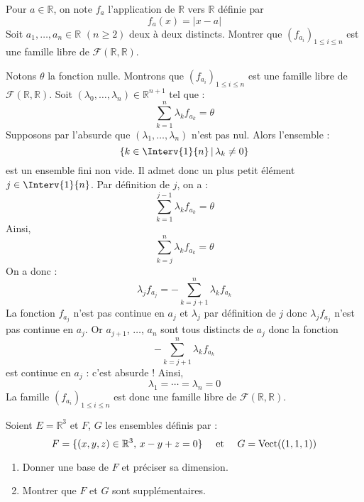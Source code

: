 \documentclass[a4paper,10pt]{report}
\begin{document}
\begin{Exercice}{} Pour $a \in \mathbb{R}$, on note $f_a$ l'application de $\mathbb{R}$ vers $\mathbb{R}$ définie par 
$$f_a(x) = \vert x - a \vert$$
Soit $a_1, \ldots, a_n \in \mathbb{R}$ $(n \geq 2)$ deux à deux distincts. Montrer que $(f_{a_i})_{1 \leq i \leq n}$ est une famille libre de $\mathcal{F}(\mathbb{R}, \mathbb{R})$.
\end{Exercice} 

\corr Notons $\theta$ la fonction nulle. Montrons que $(f_{a_i})_{1 \leq i \leq n}$ est une famille libre de $\mathcal{F}(\mathbb{R}, \mathbb{R})$. Soit $(\lambda_0, \ldots, \lambda_n) \in \mathbb{R}^{n+1}$ tel que :
$$ \sum_{k=1}^n \lambda_k f_{a_k} = \theta$$
Supposons par l'absurde que $(\lambda_1, \ldots, \lambda_n)$ n'est pas nul. Alors l'ensemble :
$$ \lbrace k \in \Interv{1}{n} \, \vert \, \lambda_k \neq 0 \rbrace$$
est un ensemble fini non vide. Il admet donc un plus petit élément $j \in \Interv{1}{n}$. Par définition de $j$, on a :
$$ \sum_{k=1}^{j-1} \lambda_k f_{a_k} = \theta$$
Ainsi,
$$ \sum_{k=j}^n \lambda_k f_{a_k} = \theta$$
On a donc :
$$ \lambda_j f_{a_j} = - \sum_{k=j+1}^n \lambda_k f_{a_k}$$
La fonction $f_{a_j}$ n'est pas continue en $a_j$ et $\lambda_j$ par définition de $j$ donc $\lambda_j f_{a_j}$ n'est pas continue en $a_j$. Or $a_{j+1}$, $\ldots$, $a_n$ sont tous distincts de $a_j$ donc la fonction 
$$ - \sum_{k=j+1}^n \lambda_k f_{a_k}$$
est continue en $a_j$ : c'est absurde ! Ainsi, 
$$ \lambda_1 = \cdots = \lambda_n = 0$$
La famille $(f_{a_i})_{1 \leq i \leq n}$ est donc une famille libre de $\mathcal{F}(\mathbb{R}, \mathbb{R})$.

\begin{Exercice}{} Soient $E= \mathbb{R}^3$ et $F$, $G$ les ensembles définis par :
$$ F = \lbrace (x,y,z) \in \mathbb{R}^3, \, x-y+z=0 \rbrace \quad \hbox{ et }  \quad G = \textrm{Vect}((1,1,1)) $$

\begin{enumerate}
\item Donner une base de $F$ et préciser sa dimension.
\item Montrer que $F$ et $G$ sont supplémentaires.
\end{enumerate}
\end{Exercice}
\end{document}
